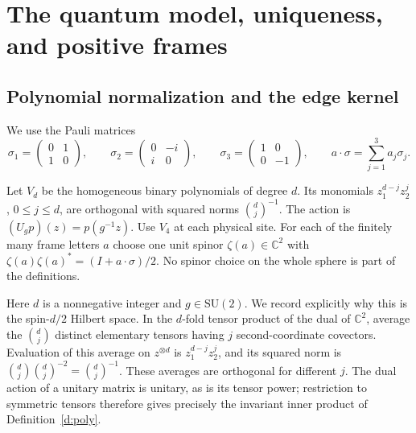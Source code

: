 \section{The quantum model, uniqueness, and positive frames}
\label{s:quantum-frames}

\subsection{Polynomial normalization and the edge kernel}

We use the Pauli matrices
\[
 \sigma_1=\begin{pmatrix}0&1\\1&0\end{pmatrix},\qquad
 \sigma_2=\begin{pmatrix}0&-i\\i&0\end{pmatrix},\qquad
 \sigma_3=\begin{pmatrix}1&0\\0&-1\end{pmatrix},
 \qquad a\cdot\sigma=\sum_{j=1}^3a_j\sigma_j.
\]

\begin{definition}\label{d:poly}
Let \(V_d\) be the homogeneous binary polynomials of degree \(d\).
Its monomials \(z_1^{d-j}z_2^j\), \(0\le j\le d\), are orthogonal with
squared norms \(\binom dj^{-1}\). The action is
\((U_gp)(z)=p(g^{-1}z)\). Use \(V_4\) at each physical site.
For each of the finitely many frame letters \(a\) choose one unit
spinor \(\zeta(a)\in\mathbb C^2\) with
\(\zeta(a)\zeta(a)^*=(I+a\cdot\sigma)/2\).
No spinor choice on the whole sphere is part of the definitions.
\end{definition}

Here \(d\) is a nonnegative integer and \(g\in\mathrm{SU}(2)\).
We record explicitly why this is the spin-\(d/2\) Hilbert space.
In the \(d\)-fold tensor product of the dual of \(\mathbb C^2\),
average the \(\binom dj\) distinct elementary tensors having \(j\)
second-coordinate covectors. Evaluation of this average on
\(z^{\otimes d}\) is \(z_1^{d-j}z_2^j\), and its squared norm is
\(\binom dj\binom dj^{-2}=\binom dj^{-1}\).
These averages are orthogonal for different \(j\).
The dual action of a unitary matrix is unitary, as is its tensor
power; restriction to symmetric tensors therefore gives precisely
the invariant inner product of Definition~\ref{d:poly}.

